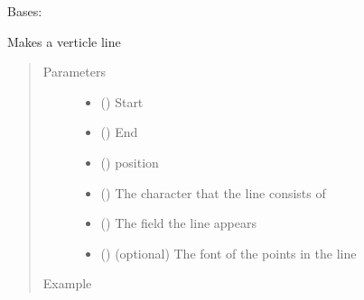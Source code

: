 \documentclass[letterpaper,10pt,english]{sphinxmanual}
\begin{document}
\begin{fulllineitems}
\label{\detokenize{pypoints:pypoints.VLine}}
Bases: 

Makes a verticle line
\begin{quote}\begin{description}
\item[{Parameters}] \leavevmode\begin{itemize}
\item {} 
 () \textendash{} Start 

\item {} 
 () \textendash{} End 

\item {} 
 () \textendash{}  position

\item {} 
 () \textendash{} The character that the line consists of

\item {} 
 () \textendash{} The field the line appears

\item {} 
 ({\hyperref[\detokenize{pypoints:pypoints.Font}]{}}) \textendash{} (optional) The font of the points in the line

\end{itemize}

\item[{Example}] \leavevmode
\end{description}\end{quote}

\begin{sphinxVerbatim}[commandchars=\\\{\}]
    
\end{sphinxVerbatim}



\end{fulllineitems}
\end{document}
